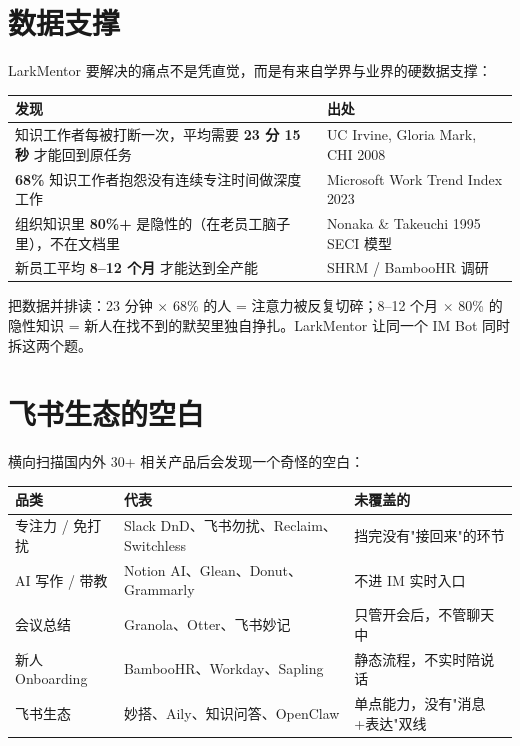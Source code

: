 \documentclass[11pt,a4paper]{ctexart}
\begin{document}
\section{数据支撑}

LarkMentor 要解决的痛点不是凭直觉，而是有来自学界与业界的硬数据支撑：

\begin{tabular}{p{10cm}p{5cm}}
\toprule
\textbf{发现} & \textbf{出处} \\
\midrule
知识工作者每被打断一次，平均需要 \textbf{23 分 15 秒} 才能回到原任务 & UC Irvine, Gloria Mark, CHI 2008 \\
\textbf{68\%} 知识工作者抱怨没有连续专注时间做深度工作 & Microsoft Work Trend Index 2023 \\
组织知识里 \textbf{80\%+} 是隐性的（在老员工脑子里），不在文档里 & Nonaka \& Takeuchi 1995 SECI 模型 \\
新员工平均 \textbf{8--12 个月} 才能达到全产能 & SHRM / BambooHR 调研 \\
\bottomrule
\end{tabular}

\vspace{0.6em}

把数据并排读：23 分钟 $\times$ 68\% 的人 = 注意力被反复切碎；8--12 个月 $\times$ 80\% 的隐性知识 = 新人在找不到的默契里独自挣扎。LarkMentor 让同一个 IM Bot 同时拆这两个题。

\section{飞书生态的空白}

横向扫描国内外 30+ 相关产品后会发现一个奇怪的空白：

\begin{tabular}{p{4cm}p{5cm}p{6cm}}
\toprule
\textbf{品类} & \textbf{代表} & \textbf{未覆盖的} \\
\midrule
专注力 / 免打扰 & Slack DnD、飞书勿扰、Reclaim、Switchless & 挡完没有"接回来"的环节 \\
AI 写作 / 带教 & Notion AI、Glean、Donut、Grammarly & 不进 IM 实时入口 \\
会议总结 & Granola、Otter、飞书妙记 & 只管开会后，不管聊天中 \\
新人 Onboarding & BambooHR、Workday、Sapling & 静态流程，不实时陪说话 \\
飞书生态 & 妙搭、Aily、知识问答、OpenClaw & 单点能力，没有"消息+表达"双线 \\
\bottomrule
\end{tabular}
\end{document}
